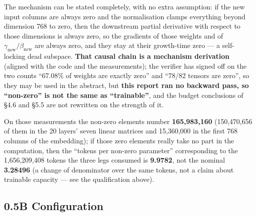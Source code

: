The mechanism can be stated completely, with no extra assumption: if the new input columns are
always zero and the normalisation clamps everything beyond dimension 768 to zero, then the
downstream partial derivative with respect to those dimensions is always zero, so the gradients
of those weights and of $\gamma_{\text{new}}/\beta_{\text{new}}$ are always zero, and they stay
at their growth-time zero --- a self-locking dead subspace. \textbf{That causal chain is a
mechanism derivation} (aligned with the code and the measurements); the verifier has signed off on
the two counts ``67.08\% of weights are exactly zero'' and ``78/82 tensors are zero'', so they may
be used in the abstract, but \textbf{this report ran no backward pass, so ``non-zero'' is not the
same as ``trainable''}, and the budget conclusions of \S4.6 and \S5.5 are not rewritten on the
strength of it.

On those measurements the non-zero elements number \textbf{165{,}983{,}160} (150{,}470{,}656 of
them in the 20 layers' seven linear matrices and 15{,}360{,}000 in the first 768 columns of the
embedding); if those zero elements really take no part in the computation, then the ``tokens per
non-zero parameter'' corresponding to the 1{,}656{,}209{,}408 tokens the three legs consumed is
\textbf{9.9782}, not the nominal \textbf{3.28496} (a change of denominator over the same tokens,
not a claim about trainable capacity --- see the qualification above).

\subsection{0.5B Configuration}

